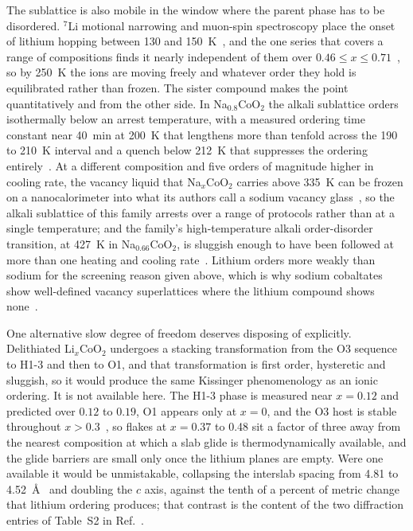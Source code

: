 \documentclass[reprint,twocolumn,prb,amsmath,amssymb,superscriptaddress,floatfix]{revtex4-2}
\begin{document}
The sublattice is also mobile in the window where the parent phase has to be disordered.
$^{7}$Li motional narrowing and muon-spin spectroscopy place the onset of lithium hopping between
130 and 150~K~\cite{Miyoshi2010,Nakamura2006,Sugiyama2009}, and the one series that covers a
range of compositions finds it nearly independent of them over $0.46\le
x\le0.71$~\cite{Miyoshi2010}, so by 250~K the ions are moving freely and whatever order they hold
is equilibrated rather than frozen. The sister compound makes the point quantitatively and from
the other side. In Na$_{0.8}$CoO$_2$ the alkali sublattice orders isothermally below an arrest
temperature, with a measured ordering time constant near 40~min at 200~K that lengthens more than
tenfold across the 190 to 210~K interval and a quench below 212~K that suppresses the ordering
entirely~\cite{Schulze2008}. At a different composition and five orders of magnitude higher in
cooling rate, the vacancy liquid that Na$_x$CoO$_2$ carries above 335~K can be frozen on a
nanocalorimeter into what its authors call a sodium vacancy glass~\cite{Galeski2016}, so the
alkali sublattice of this family arrests over a range of protocols rather than at a single
temperature; and the family's high-temperature alkali order-disorder transition, at 427~K in
Na$_{0.66}$CoO$_2$, is sluggish enough to have been followed at more than one heating and cooling
rate~\cite{Ying2008}. Lithium orders more weakly than sodium for the screening reason given
above, which is why sodium cobaltates show well-defined vacancy superlattices where the lithium
compound shows none~\cite{Motohashi2009,OuYang2012}.

One alternative slow degree of freedom deserves disposing of explicitly. Delithiated
Li$_x$CoO$_2$ undergoes a stacking transformation from the O3 sequence to H1-3 and then to O1,
and that transformation is first order, hysteretic and sluggish, so it would produce the same
Kissinger phenomenology as an ionic ordering. It is not available here. The H1-3 phase is
measured near $x=0.12$ and predicted over $0.12$ to $0.19$, O1 appears only at $x=0$, and the O3
host is stable throughout $x>0.3$~\cite{Motohashi2009,VanderVen1998,Chen2002,Amatucci1996}, so
flakes at $x=0.37$ to 0.48 sit a factor of three away from the nearest composition at which a
slab glide is thermodynamically available, and the glide barriers are small only once the
lithium planes are empty. Were one available it would be unmistakable, collapsing the interslab
spacing from 4.81 to 4.52~\AA~\cite{Motohashi2009} and doubling the $c$ axis, against the tenth
of a percent of metric change that lithium ordering produces; that contrast is the content of the two
diffraction entries of Table~S2 in Ref.~\cite{SM}.
\end{document}
